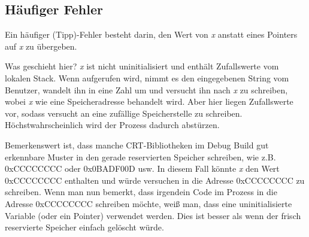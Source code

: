 \subsection{Häufiger Fehler}
Ein häufiger (Tipp)-Fehler besteht darin, den Wert von \emph{x} anstatt eines Pointers auf \emph{x} zu übergeben.



Was geschieht hier?
\emph{x} ist nicht uninitialisiert und enthält Zufallswerte vom lokalen Stack. Wenn \scanf aufgerufen wird, nimmt es den eingegebenen String vom Benutzer, wandelt ihn in eine Zahl um und versucht ihn nach \emph{x} zu schreiben, wobei \emph{x} wie eine Speicheradresse behandelt wird.
Aber hier liegen Zufallswerte vor, sodass \scanf versucht an eine zufällige Speicherstelle zu schreiben. 
Höchstwahrscheinlich wird der Prozess dadurch abstürzen.

Bemerkenswert ist, dass manche \ac{CRT}-Bibliotheken im Debug Build gut erkennbare Muster in den gerade reservierten Speicher schreiben, wie z.B. 0xCCCCCCCC oder 0x0BADF00D usw.
In diesem Fall könnte \emph{x} den Wert 0xCCCCCCCC enthalten und \scanf würde versuchen in die Adresse 0xCCCCCCCC zu schreiben. 
Wenn man nun bemerkt, dass irgendein Code im Prozess in die Adresse 0xCCCCCCCC schreiben möchte, weiß man, dass eine uninitialisierte Variable (oder ein Pointer) verwendet werden.
Dies ist besser als wenn der frisch reservierte Speicher einfach gelöscht würde.


